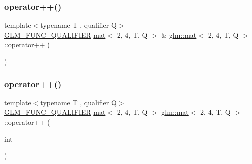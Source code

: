 \mbox{\label{structglm_1_1mat_3_012_00_014_00_01_t_00_01_q_01_4_ad7e4a06905e2d7bab5a417c3db224ce3}} 
\subsubsection{\texorpdfstring{operator++()}{operator++()}\hspace{0.1cm}{\footnotesize\ttfamily [1/2]}}
{\footnotesize\ttfamily template$<$typename T , qualifier Q$>$ \\
\mbox{\hyperlink{setup_8hpp_a33fdea6f91c5f834105f7415e2a64407}{G\+L\+M\+\_\+\+F\+U\+N\+C\+\_\+\+Q\+U\+A\+L\+I\+F\+I\+ER}} \mbox{\hyperlink{structglm_1_1mat}{mat}}$<$ 2, 4, T, Q $>$ \& \mbox{\hyperlink{structglm_1_1mat}{glm\+::mat}}$<$ 2, 4, T, Q $>$\+::operator++ (\begin{DoxyParamCaption}{ }\end{DoxyParamCaption})}

\mbox{\label{structglm_1_1mat_3_012_00_014_00_01_t_00_01_q_01_4_a1f4e7b363fde7f785ace4e12a9c41316}} 
\subsubsection{\texorpdfstring{operator++()}{operator++()}\hspace{0.1cm}{\footnotesize\ttfamily [2/2]}}
{\footnotesize\ttfamily template$<$typename T , qualifier Q$>$ \\
\mbox{\hyperlink{setup_8hpp_a33fdea6f91c5f834105f7415e2a64407}{G\+L\+M\+\_\+\+F\+U\+N\+C\+\_\+\+Q\+U\+A\+L\+I\+F\+I\+ER}} \mbox{\hyperlink{structglm_1_1mat}{mat}}$<$ 2, 4, T, Q $>$ \mbox{\hyperlink{structglm_1_1mat}{glm\+::mat}}$<$ 2, 4, T, Q $>$\+::operator++ (\begin{DoxyParamCaption}\item[{int}]{ }\end{DoxyParamCaption})}

\mbox{\label{structglm_1_1mat_3_012_00_014_00_01_t_00_01_q_01_4_a9db5a3048b0256fb313cdd6a41da96a1}} 
